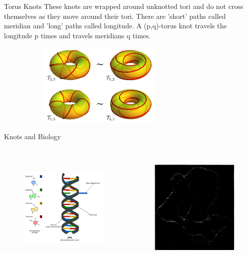 \begin{frame}{Torus Knots}
These knots are wrapped around unknotted tori and do not cross themselves as they move around their tori. There are 'short' paths called meridian and 'long' paths called longitude. A (p,q)-torus knot travels the longitude p times and travels meridians q times.
\begin{figure}
    \centering
    \includegraphics[height= 4cm, width=8cm]{images/torus.png}
    \label{torus}
   
\end{figure}
\cite{article}    
\end{frame}
\begin{frame}{Knots and Biology}
\begin{columns}[T]
\begin{column}{.48\textwidth}
\cite{555w}
\begin{figure}
    \centering
    \includegraphics[width= 6cm,height=5.5cm]{images/dnastring.png}
    \label{dnast}
\end{figure}
\end{column}
\begin{column}{.48\textwidth}
\cite{adams2004knot}
\begin{figure}[h]
    \centering
    \includegraphics[width= 6cm,height=5.5cm]{images/electron.png}
    \label{elec}
\end{figure}
\end{column}
\end{columns}
\end{frame}
